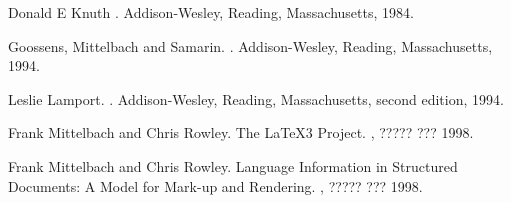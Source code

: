 \documentclass{article}
\begin{document}
\begin{thebibliography}{1}

Donald E Knuth
.
\newblock Addison-Wesley, Reading, Massachusetts, 1984.

Goossens, Mittelbach and Samarin.
.
\newblock Addison-Wesley, Reading, Massachusetts, 1994.

Leslie Lamport.
.
\newblock Addison-Wesley, Reading, Massachusetts, second edition, 1994.

Frank Mittelbach and Chris Rowley.
\newblock The {\LaTeX3} Project.
, ????? ??? 1998.

Frank Mittelbach and Chris Rowley.
\newblock Language Information in
Structured Documents: A Model for Mark-up and Rendering.
, ????? ??? 1998.

\end{thebibliography}
\end{document}

